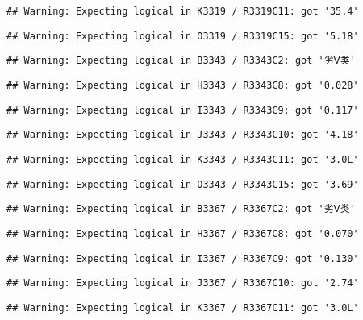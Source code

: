 \documentclass[
]{article}
\begin{document}
\begin{verbatim}
## Warning: Expecting logical in K3319 / R3319C11: got '35.4'
\end{verbatim}

\begin{verbatim}
## Warning: Expecting logical in O3319 / R3319C15: got '5.18'
\end{verbatim}

\begin{verbatim}
## Warning: Expecting logical in B3343 / R3343C2: got '劣Ⅴ类'
\end{verbatim}

\begin{verbatim}
## Warning: Expecting logical in H3343 / R3343C8: got '0.028'
\end{verbatim}

\begin{verbatim}
## Warning: Expecting logical in I3343 / R3343C9: got '0.117'
\end{verbatim}

\begin{verbatim}
## Warning: Expecting logical in J3343 / R3343C10: got '4.18'
\end{verbatim}

\begin{verbatim}
## Warning: Expecting logical in K3343 / R3343C11: got '3.0L'
\end{verbatim}

\begin{verbatim}
## Warning: Expecting logical in O3343 / R3343C15: got '3.69'
\end{verbatim}

\begin{verbatim}
## Warning: Expecting logical in B3367 / R3367C2: got '劣Ⅴ类'
\end{verbatim}

\begin{verbatim}
## Warning: Expecting logical in H3367 / R3367C8: got '0.070'
\end{verbatim}

\begin{verbatim}
## Warning: Expecting logical in I3367 / R3367C9: got '0.130'
\end{verbatim}

\begin{verbatim}
## Warning: Expecting logical in J3367 / R3367C10: got '2.74'
\end{verbatim}

\begin{verbatim}
## Warning: Expecting logical in K3367 / R3367C11: got '3.0L'
\end{verbatim}
\end{document}
